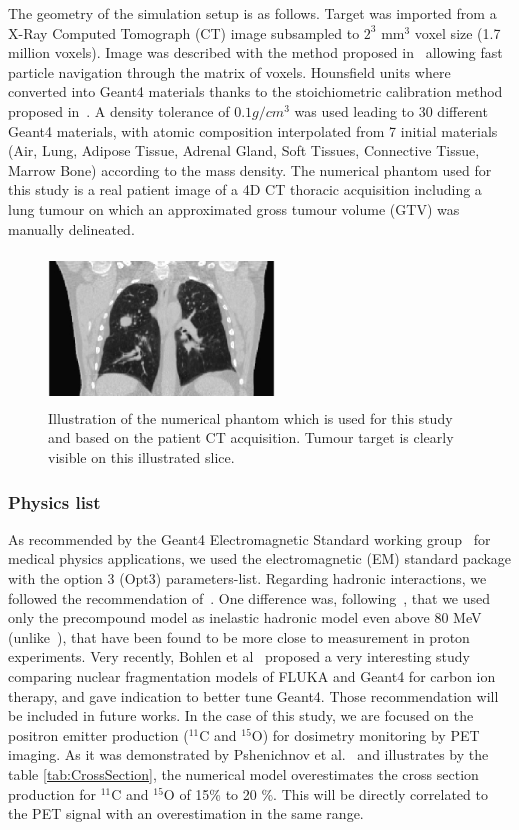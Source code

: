 \documentclass[11pt]{iopart}
\begin{document}
The geometry of the simulation setup is as follows. Target was imported from a X-Ray Computed Tomograph (CT) image subsampled to $2^3$ mm$^3$ voxel size (1.7 million voxels). Image was described with the method proposed in~\cite{Sarrut2008} allowing fast particle navigation through the matrix of voxels. Hounsfield units where converted into Geant4 materials thanks to the stoichiometric calibration method proposed in~\cite{Schneider2000a}. A density tolerance of $0.1 g/cm^3$ was used leading to $30$ different Geant4 materials, with atomic composition interpolated from 7 initial materials (Air, Lung, Adipose Tissue, Adrenal Gland, Soft Tissues, Connective Tissue, Marrow Bone) according to the mass density. The numerical phantom used for this study is a real patient image of a 4D CT thoracic acquisition including a lung tumour on which an approximated gross tumour volume (GTV) was manually delineated. 

\begin{figure}[!h]
\centering
\includegraphics[width=6cm,height=40mm]{figures/phantomCT.jpg}
\caption{Illustration of the numerical phantom which is used for this study and based on the patient CT acquisition. Tumour target is clearly visible
on this illustrated slice.}
\label{fig00}
\end{figure}

\subsubsection{Physics list}

As recommended by the Geant4 Electromagnetic Standard working group~\cite{G4EMGroup2010} for medical physics applications, we used the electromagnetic (EM) standard package with the option 3 (Opt3) parameters-list. Regarding hadronic interactions, we followed the recommendation of~\cite{Pshenichnov2007, Zacharatou2008}. One difference was, following~\cite{Polf2009, Peterson2009, Grevillot2010}, that we used only the precompound model as inelastic hadronic model even above 80 MeV (unlike~\cite{Pshenichnov2007}), that have been found to be more close to measurement in proton experiments. Very recently, Bohlen et al~\cite{Bohlen2010} proposed a very interesting study comparing nuclear fragmentation models of FLUKA and Geant4 for carbon ion therapy, and gave indication to better tune Geant4. Those recommendation will be included in future works. 
In the case of this study, we are focused on the positron emitter production ($^{11}$C and $^{15}$O) for dosimetry monitoring by PET imaging. As it was demonstrated by Pshenichnov et al.~\cite{Pshenichnov2006} and illustrates by the table \ref{tab:CrossSection}, the numerical model overestimates the cross section production for $^{11}$C and $^{15}$O of 15\% to 20 \%. This will be directly correlated to the PET signal with an overestimation in the same range.
\end{document}
